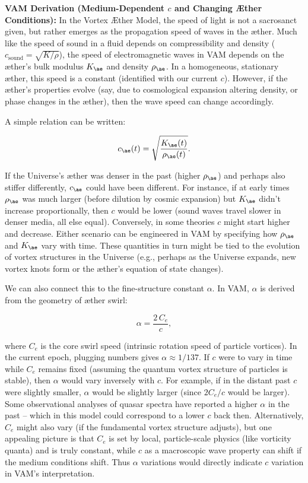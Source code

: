 \documentclass[a4paper, aps,preprint,superscriptaddress, 12pt]{revtex4}
\begin{document}
\textbf{VAM Derivation (Medium-Dependent $c$ and Changing Æther Conditions):} In the Vortex Æther Model, the speed of light is not a sacrosanct given, but rather emerges as the propagation speed of waves in the æther. Much like the speed of sound in a fluid depends on compressibility and density ($c_{\text{sound}} = \sqrt{K/\rho}$), the speed of electromagnetic waves in VAM depends on the æther’s bulk modulus $K_{\ae}$ and density $\rho_{\ae}$. In a homogeneous, stationary æther, this speed is a constant (identified with our current $c$). However, if the æther’s properties evolve (say, due to cosmological expansion altering density, or phase changes in the æther), then the wave speed can change accordingly.


A simple relation can be written:

\begin{equation}
    c_{\ae}(t) = \sqrt{\frac{K_{\ae}(t)}{\rho_{\ae}(t)}}.
\end{equation}

If the Universe’s æther was denser in the past (higher $\rho_{\ae}$) and perhaps also stiffer differently, $c_{\ae}$ could have been different. For instance, if at early times $\rho_{\ae}$ was much larger (before dilution by cosmic expansion) but $K_{\ae}$ didn’t increase proportionally, then $c$ would be lower (sound waves travel slower in denser media, all else equal). Conversely, in some theories $c$ might start higher and decrease. Either scenario can be engineered in VAM by specifying how $\rho_{\ae}$ and $K_{\ae}$ vary with time. These quantities in turn might be tied to the evolution of vortex structures in the Universe (e.g., perhaps as the Universe expands, new vortex knots form or the æther’s equation of state changes).


We can also connect this to the fine-structure constant $\alpha$. In VAM, $\alpha$ is derived from the geometry of æther swirl:

\begin{equation}
    \alpha = \frac{2\,C_e}{c},
\end{equation}

where $C_e$ is the core swirl speed (intrinsic rotation speed of particle vortices). In the current epoch, plugging numbers gives $\alpha\approx1/137$. If $c$ were to vary in time while $C_e$ remains fixed (assuming the quantum vortex structure of particles is stable), then $\alpha$ would vary inversely with $c$. For example, if in the distant past $c$ were slightly smaller, $\alpha$ would be slightly larger (since $2C_e/c$ would be larger). Some observational analyses of quasar spectra have reported a higher $\alpha$ in the past – which in this model could correspond to a lower $c$ back then. Alternatively, $C_e$ might also vary (if the fundamental vortex structure adjusts), but one appealing picture is that $C_e$ is set by local, particle-scale physics (like vorticity quanta) and is truly constant, while $c$ as a macroscopic wave property can shift if the medium conditions shift. Thus $\alpha$ variations would directly indicate $c$ variation in VAM’s interpretation.
\end{document}
